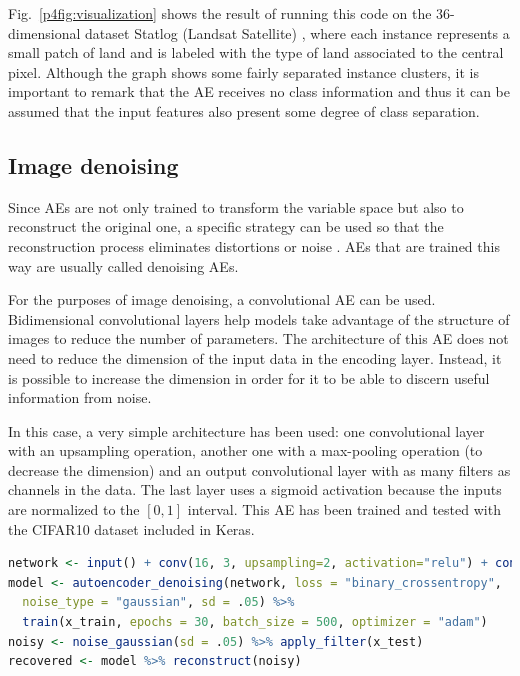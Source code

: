 Fig.~\ref{p4fig:visualization} shows the result of running this code on the 36-dimensional dataset Statlog (Landsat Satellite) \cite{ucirepo}, 
where each instance represents a small patch of land and is labeled with the type of land associated to the central pixel. Although the graph shows some fairly separated instance clusters, it is important to remark that the AE receives no class information and thus it can be assumed that the input features also present some degree of class separation.


\subsection{Image denoising}
\label{p4sec.denoising}

Since AEs are not only trained to transform the variable space but also to reconstruct the original one, a specific strategy can be used so that the reconstruction process eliminates distortions or noise \cite{xie}. AEs that are trained this way are usually called denoising AEs.

For the purposes of image denoising, a convolutional AE can be used. Bidimensional convolutional layers \cite{dlbook-conv} help models take advantage of the structure of images to reduce the number of parameters. The architecture of this AE does not need to reduce the dimension of the input data in the encoding layer. Instead, it is possible to increase the dimension in order for it to be able to discern useful information from noise. 

In this case, a very simple architecture has been used: one convolutional layer with an upsampling operation, another one with a max-pooling operation (to decrease the dimension) and an output convolutional layer with as many filters as channels in the data. The last layer uses a sigmoid activation because the inputs are normalized to the $[0,1]$ interval. This AE has been trained and tested with the CIFAR10 dataset included in Keras.

\begin{lstlisting}[language=R]
network <- input() + conv(16, 3, upsampling=2, activation="relu") + conv(16, 3, max_pooling=2, activation="relu") + conv(3, 3, activation="sigmoid")
model <- autoencoder_denoising(network, loss = "binary_crossentropy", 
  noise_type = "gaussian", sd = .05) %>%
  train(x_train, epochs = 30, batch_size = 500, optimizer = "adam")
noisy <- noise_gaussian(sd = .05) %>% apply_filter(x_test)
recovered <- model %>% reconstruct(noisy)
\end{lstlisting}

